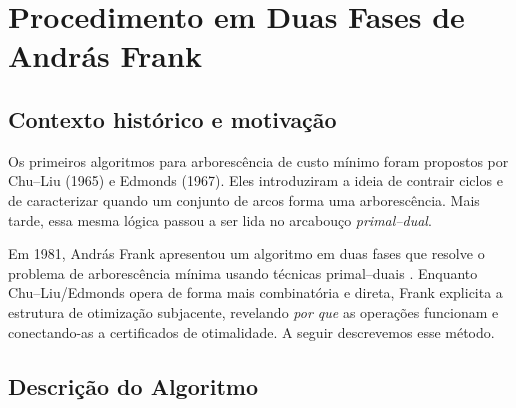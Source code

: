 \chapter{Procedimento em Duas Fases de András Frank}

\section{Contexto histórico e motivação}

Os primeiros algoritmos para arborescência de custo mínimo foram propostos por Chu–Liu (1965) e Edmonds (1967). Eles introduziram a ideia de contrair ciclos e de caracterizar quando um conjunto de arcos forma uma arborescência. Mais tarde, essa mesma lógica passou a ser lida no arcabouço \emph{primal–dual}.


Em 1981, András Frank apresentou um algoritmo em duas fases que resolve o problema de arborescência mínima usando técnicas primal–duais \cite{frank1981}. Enquanto Chu–Liu/Edmonds opera de forma mais combinatória e direta, Frank explicita a estrutura de otimização subjacente, revelando \emph{por que} as operações funcionam e conectando-as a certificados de otimalidade. A seguir descrevemos esse método.

\section{Descrição do Algoritmo}

